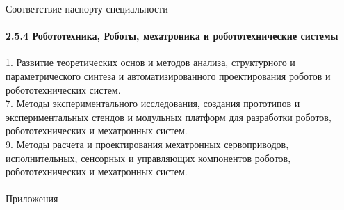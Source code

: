 \documentclass[aspectratio=169,xcolor=table,10pt]{beamer}
\begin{document}

\begin{frame}[t]{Соответствие паспорту специальности}
    \framesubtitle{2.5.4 Робототехника, Роботы, мехатроника и
        робототехнические системы}
    1. Развитие теоретических основ и методов анализа, структурного и параметрического синтеза и автоматизированного проектирования роботов и робототехнических систем. \\
    7. Методы экспериментального исследования, создания прототипов и
    экспериментальных стендов и модульных платформ для разработки роботов, робототехнических и мехатронных систем. \\
    9. Методы расчета и проектирования мехатронных сервоприводов,
    исполнительных, сенсорных и управляющих компонентов роботов,
    робототехнических и мехатронных систем.
\end{frame}

\begin{frame}[c]{}
    \framesubtitle{}
    \centering\LARGE Приложения
\end{frame}

\end{document}
